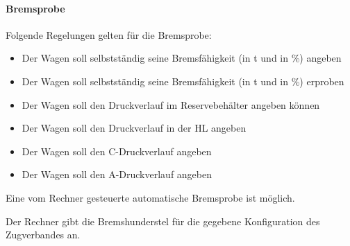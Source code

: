 \paragraph{Bremsprobe}
\begin{feat}
Folgende Regelungen gelten für die Bremsprobe:
\begin{itemize}
    \item Der Wagen soll selbstständig seine Bremsfähigkeit (in t und in \%) angeben
    \item Der Wagen soll selbstständig seine Bremsfähigkeit (in t und in \%) erproben
    \item Der Wagen soll den Druckverlauf im Reservebehälter angeben können
    \item Der Wagen soll den Druckverlauf in der \acrshort{HL} angeben
    \item Der Wagen soll den C-Druckverlauf angeben
    \item Der Wagen soll den A-Druckverlauf angeben
\end{itemize}
\end{feat}
\begin{feat}
Eine vom Rechner gesteuerte automatische Bremsprobe ist möglich.
\end{feat}
\begin{rem} [zu Anf. 58] 
Der Rechner gibt die Bremshunderstel für die gegebene Konfiguration des \gls{Zugverband}es an.
\begin{comment}
Diese hat sich für folgende Fahrten zu unterscheiden:
\begin{itemize}
    \item für Bedienfahrt
    \item für Rangierfahrt
    \item für Sperrfahrt
    \item für Zugfahrt
\end{itemize}
\end{comment}
\end{rem}

